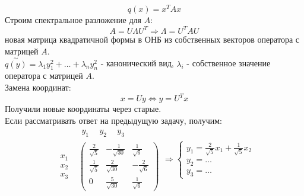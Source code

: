 \documentclass[12pt, letterpaper, twoside]{article}
\begin{document}
\[q(x) = x^T A x\]
Строим спектральное разложение для $A$:
\[A = U\Lambda U^T\Rightarrow \Lambda = U^T A U\]
новая матрица квадратичной формы в ОНБ из собственных векторов оператора с матрицей $A$.\\
$\overset{\sim}{q(y)} = \lambda_1 y_1^2 + \dots + \lambda_n y_n^2$ - канонический вид, $\lambda_i$ - собственное значение оператора с матрицей $A$.\\
Замена координат:
\[x = Uy\Leftrightarrow y = U^T x\]
Получили новые координаты через старые.\\
Если рассматривать ответ на предыдущую задачу, получим:
\[\begin{matrix}
    & \begin{matrix}
        y_1\ \ & y_2\ \ & y_3
    \end{matrix}\\
    \begin{matrix}
        x_1\\
        x_2\\
        x_3
    \end{matrix} & \begin{pmatrix}
        \frac{2}{\sqrt{5}} & -\frac{1}{\sqrt{30}} & \frac{1}{\sqrt{6}}\\
        \frac{1}{\sqrt{5}} & \frac{2}{\sqrt{30}} & -\frac{2}{\sqrt{6}}\\
        0 & \frac{5}{\sqrt{30}} & \frac{1}{\sqrt{6}}
    \end{pmatrix}
\end{matrix}\Rightarrow \begin{cases}
    y_1 = \frac{2}{\sqrt{5}} x_1 + \frac{1}{\sqrt{5}}x_2\\
    y_2 = \dots\\
    y_3 = \dots
\end{cases}\]
\end{document}
